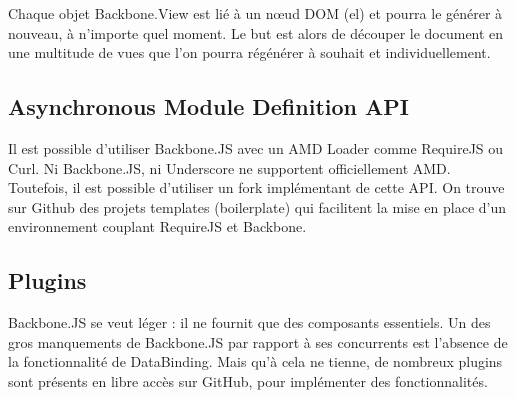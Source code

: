 Chaque objet Backbone.View est lié à un nœud DOM (el) et pourra le générer à nouveau, à n’importe quel moment. Le but est alors de découper le document en une multitude de vues que l’on pourra régénérer à souhait et individuellement.

\subsection{Asynchronous Module Definition API}

Il est possible d’utiliser Backbone.JS avec un AMD Loader comme RequireJS ou Curl. Ni Backbone.JS, ni Underscore ne supportent officiellement AMD. Toutefois, il est possible d’utiliser un fork implémentant de cette API.
On trouve sur Github des projets templates (boilerplate) qui facilitent la mise en place d’un environnement couplant RequireJS et Backbone.

\subsection{Plugins}

Backbone.JS se veut léger : il ne fournit que des composants essentiels. Un des gros manquements de Backbone.JS par rapport à ses concurrents est l’absence de la fonctionnalité de DataBinding. Mais qu’à cela ne tienne, de nombreux plugins sont présents en libre accès sur GitHub, pour implémenter des fonctionnalités. 
